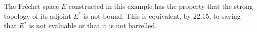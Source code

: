 The Fréchet space $E$ constructed in this example has the property that the strong topology of its adjoint $E^*$ is not bound. This is equivalent, by 22.15, to saying that $E^*$ is not evaluable or that it is not barrelled.
